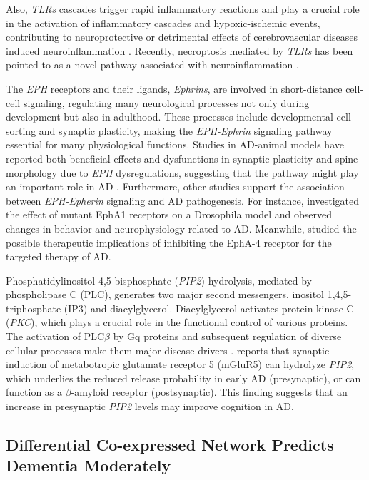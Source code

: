 \documentclass[utf8]{FrontiersinHarvard} %
\begin{document}
Also, \textit{TLRs} cascades trigger rapid inflammatory reactions and play a crucial role in the activation of inflammatory cascades and hypoxic-ischemic events, contributing to neuroprotective or detrimental effects of cerebrovascular diseases induced neuroinflammation \citep{ciesielska2021tlr4,ashayeri2021toll}. Recently, necroptosis mediated by \textit{TLRs} has been pointed to as a novel pathway associated with neuroinflammation \citep{yu2021necroptosis}.

The \textit{EPH} receptors and their ligands, \textit{Ephrins}, are involved in short-distance cell-cell signaling, regulating many neurological processes not only during development but also in adulthood. These processes include developmental cell sorting and synaptic plasticity, making the \textit{EPH-Ephrin} signaling pathway essential for many physiological functions. Studies in AD-animal models have reported both beneficial effects and dysfunctions in synaptic plasticity and spine morphology due to \textit{EPH} dysregulations, suggesting that the pathway might play an important role in AD \citep{kania2016mechanisms}. Furthermore, other studies support the association between \textit{EPH-Epherin} signaling and AD pathogenesis. For instance, \citet{buhl2022effects} investigated the effect of mutant EphA1 receptors on a Drosophila model and observed changes in behavior and neurophysiology related to AD. Meanwhile, \citet{ganguly2022mechanistic} studied the possible therapeutic implications of inhibiting the EphA-4 receptor for the targeted therapy of AD.

Phosphatidylinositol 4,5-bisphosphate (\textit{PIP2}) hydrolysis, mediated by phospholipase C (PLC), generates two major second messengers, inositol 1,4,5-triphosphate (IP3) and diacylglycerol. Diacylglycerol activates protein kinase C (\textit{PKC}), which plays a crucial role in the functional control of various proteins. The activation of PLC$\beta$ by Gq proteins and subsequent regulation of diverse cellular processes make them major disease drivers \citep{carr2021fluorogenic, kankanamge2021dissociation}. \citet{he2019amyloid} reports that synaptic induction of metabotropic glutamate receptor 5 (mGluR5) can hydrolyze \textit{PIP2}, which underlies the reduced release probability in early AD (presynaptic), or can function as a $\beta$-amyloid receptor (postsynaptic). This finding suggests that an increase in presynaptic \textit{PIP2} levels may improve cognition in AD.

\subsection{Differential Co-expressed Network Predicts Dementia Moderately}
\end{document}
